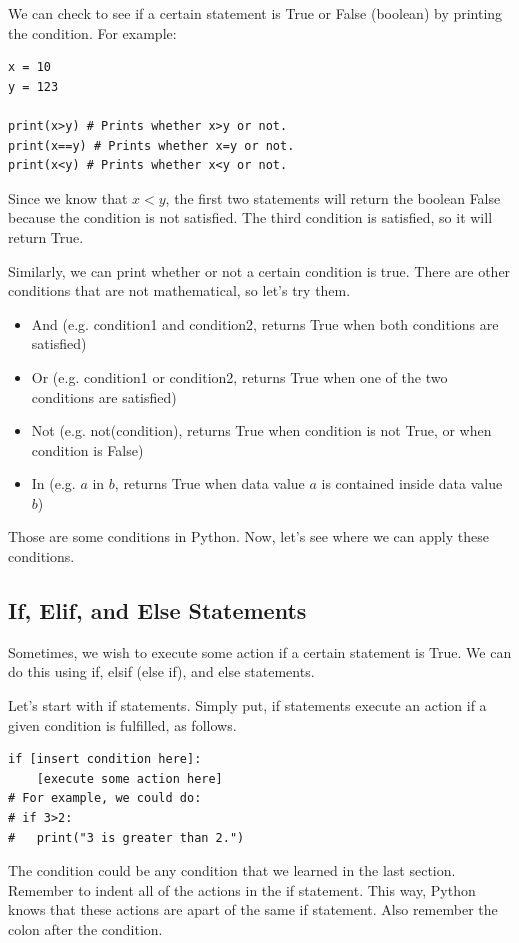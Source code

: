 \documentclass{article}
\begin{document}
We can check to see if a certain statement is True or False (boolean) by printing the condition. For example:
\begin{lstlisting}
x = 10
y = 123

print(x>y) # Prints whether x>y or not.
print(x==y) # Prints whether x=y or not.
print(x<y) # Prints whether x<y or not.
\end{lstlisting}
Since we know that $x<y$, the first two statements will return the boolean False because the condition is not satisfied. The third condition is satisfied, so it will return True. 

Similarly, we can print whether or not a certain condition is true. There are other conditions that are not mathematical, so let's try them. 
\begin{itemize}
    \item And (e.g. condition1 and condition2, returns True when both conditions are satisfied)
    \item Or (e.g. condition1 or condition2, returns True when one of the two conditions are satisfied)
    \item Not (e.g. not(condition), returns True when condition is not True, or when condition is False)
    \item In (e.g. $a$ in $b$, returns True when data value $a$ is contained inside data value $b$)
\end{itemize}

Those are some conditions in Python. Now, let's see where we can apply these conditions. 

\subsection{If, Elif, and Else Statements}
Sometimes, we wish to execute some action if a certain statement is True. We can do this using if, elsif (else if), and else statements. 

Let's start with if statements. Simply put, if statements execute an action if a given condition is fulfilled, as follows. 
\begin{lstlisting}
if [insert condition here]:
    [execute some action here]
# For example, we could do:
# if 3>2:
#   print("3 is greater than 2.")
\end{lstlisting}
The condition could be any condition that we learned in the last section. Remember to indent all of the actions in the if statement. This way, Python knows that these actions are apart of the same if statement. Also remember the colon after the condition. 
\end{document}

